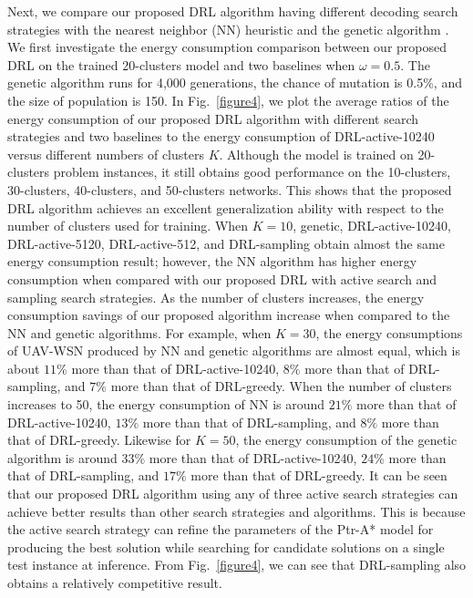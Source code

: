 \documentclass[journal]{IEEEtran}
\begin{document}
Next, we compare our proposed DRL algorithm having different decoding search strategies with the nearest neighbor (NN) heuristic \cite{B. Hu} and the genetic algorithm \cite{J. Li}. We first investigate the energy consumption comparison between our proposed DRL on the trained 20-clusters model and two baselines when $\omega=0.5$. The genetic algorithm runs for 4,000 generations, the chance of mutation is 0.5\%, and the size of population is 150. In Fig.~\ref{figure4}, we plot the average ratios of the energy consumption of our proposed DRL algorithm with different search strategies and two baselines to the energy consumption of DRL-active-10240 versus different numbers of clusters $K$. Although the model is trained on 20-clusters problem instances, it still obtains good performance on the 10-clusters, 30-clusters, 40-clusters, and 50-clusters networks. This shows that the proposed DRL algorithm achieves an excellent generalization ability with respect to the number of clusters used for training. When $K=10$, genetic, DRL-active-10240, DRL-active-5120, DRL-active-512, and DRL-sampling obtain almost the same energy consumption result; however, the NN algorithm has higher energy consumption when compared with our proposed DRL with active search and sampling search strategies. As the number of clusters increases, the energy consumption savings of our proposed algorithm increase when compared to the NN and genetic algorithms. For example, when $K=30$, the energy consumptions of UAV-WSN produced by NN and genetic algorithms are almost equal, which is about $11\%$ more than that of DRL-active-10240, $8\%$ more than that of DRL-sampling, and $7\%$ more than that of DRL-greedy. When the number of clusters increases to 50, the energy consumption of NN is around $21\%$ more than that of DRL-active-10240, $13\%$ more than that of DRL-sampling, and $8\%$ more than that of DRL-greedy. Likewise for $K=50$, the energy consumption of the genetic algorithm is around $33\%$ more than that of DRL-active-10240, $24\%$ more than that of DRL-sampling, and $17\%$ more than that of DRL-greedy. It can be seen that our proposed DRL algorithm using any of three active search strategies can achieve better results than other search strategies and algorithms. This is because the active search strategy can refine the parameters of the Ptr-A* model for producing the best solution while searching for candidate solutions on a single test instance at inference. From Fig.~\ref{figure4}, we can see that DRL-sampling also obtains a relatively competitive result.
\end{document}
